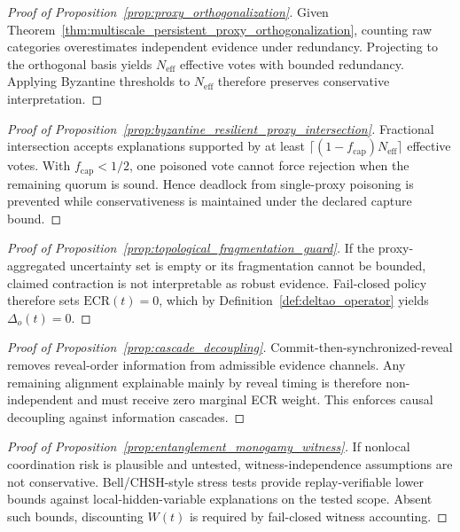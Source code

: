 \documentclass[11pt]{article}
\theoremstyle{definition}
\theoremstyle{plain}
\newcommand{\deltao}{\Delta_o}
\newcommand{\fcap}{f_{\mathrm{cap}}}
\newcommand{\Neff}{N_{\mathrm{eff}}}
\begin{document}
\begin{proof}[Proof of Proposition~\ref{prop:proxy_orthogonalization}]
Given Theorem~\ref{thm:multiscale_persistent_proxy_orthogonalization}, counting raw categories overestimates independent evidence under redundancy.
Projecting to the orthogonal basis yields $\Neff$ effective votes with bounded redundancy.
Applying Byzantine thresholds to $\Neff$ therefore preserves conservative interpretation.
\end{proof}

\begin{proof}[Proof of Proposition~\ref{prop:byzantine_resilient_proxy_intersection}]
Fractional intersection accepts explanations supported by at least $\lceil(1-\fcap)\Neff\rceil$ effective votes.
With $\fcap<1/2$, one poisoned vote cannot force rejection when the remaining quorum is sound.
Hence deadlock from single-proxy poisoning is prevented while conservativeness is maintained under the declared capture bound.
\end{proof}

\begin{proof}[Proof of Proposition~\ref{prop:topological_fragmentation_guard}]
If the proxy-aggregated uncertainty set is empty or its fragmentation cannot be bounded, claimed contraction is not interpretable as robust evidence.
Fail-closed policy therefore sets $\mathrm{ECR}(t)=0$, which by Definition~\ref{def:deltao_operator} yields $\deltao(t)=0$.
\end{proof}

\begin{proof}[Proof of Proposition~\ref{prop:cascade_decoupling}]
Commit-then-synchronized-reveal removes reveal-order information from admissible evidence channels.
Any remaining alignment explainable mainly by reveal timing is therefore non-independent and must receive zero marginal ECR weight.
This enforces causal decoupling against information cascades.
\end{proof}

\begin{proof}[Proof of Proposition~\ref{prop:entanglement_monogamy_witness}]
If nonlocal coordination risk is plausible and untested, witness-independence assumptions are not conservative.
Bell/CHSH-style stress tests provide replay-verifiable lower bounds against local-hidden-variable explanations on the tested scope.
Absent such bounds, discounting $W(t)$ is required by fail-closed witness accounting.
\end{proof}
\end{document}
